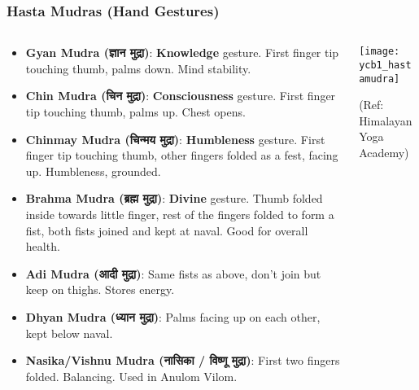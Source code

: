 \begin{frame}[fragile]\frametitle{Hasta Mudras (Hand Gestures)}
\begin{columns}
    \begin{column}[T]{0.5\linewidth}
      \begin{itemize}
        \item \textbf{Gyan Mudra (ज्ञान मुद्रा)}: \textbf{Knowledge} gesture. First finger tip touching thumb, palms down. Mind stability.
        \item \textbf{Chin Mudra (चिन मुद्रा)}: \textbf{Consciousness} gesture. First finger tip touching thumb, palms up. Chest opens.
        \item \textbf{Chinmay Mudra (चिन्मय  मुद्रा)}: \textbf{Humbleness} gesture. First finger tip touching thumb, other fingers folded as a fest, facing up. Humbleness, grounded.	
		\item \textbf{Brahma Mudra (ब्रह्म   मुद्रा)}: \textbf{Divine} gesture. Thumb folded inside towards little finger, rest of the fingers folded to form a fist, both fists joined and kept at naval. Good for overall health.
		\item \textbf{Adi Mudra (आदी   मुद्रा)}: Same fists as above, don't join but keep on thighs.  Stores energy.
		\item \textbf{Dhyan Mudra (ध्यान    मुद्रा)}: Palms facing up on each other, kept below naval.
		\item \textbf{Nasika/Vishnu Mudra (नासिका / विष्णू     मुद्रा)}: First two fingers folded. Balancing. Used in Anulom Vilom.
      \end{itemize}
    \end{column}
    \begin{column}[T]{0.5\linewidth}
        \begin{center}
        \texttt{[image: ycb1\_hastamudra]}
				
		{\tiny (Ref: Himalayan Yoga Academy)}	 
        \end{center}	
    \end{column}
\end{columns}
\end{frame}


